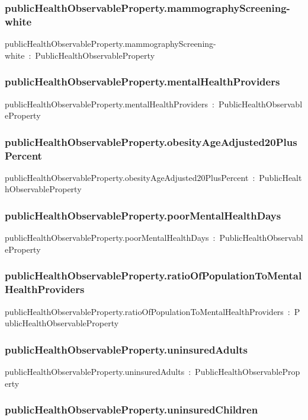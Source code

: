 \documentclass{article}
\begin{document}
\subsubsection*{publicHealthObservableProperty.mammographyScreening-white}

publicHealthObservableProperty.mammographyScreening-white~:~PublicHealthObservableProperty

\subsubsection*{publicHealthObservableProperty.mentalHealthProviders}

publicHealthObservableProperty.mentalHealthProviders~:~PublicHealthObservableProperty

\subsubsection*{publicHealthObservableProperty.obesityAgeAdjusted20PlusPercent}

publicHealthObservableProperty.obesityAgeAdjusted20PlusPercent~:~PublicHealthObservableProperty

\subsubsection*{publicHealthObservableProperty.poorMentalHealthDays}

publicHealthObservableProperty.poorMentalHealthDays~:~PublicHealthObservableProperty

\subsubsection*{publicHealthObservableProperty.ratioOfPopulationToMentalHealthProviders}

publicHealthObservableProperty.ratioOfPopulationToMentalHealthProviders~:~PublicHealthObservableProperty

\subsubsection*{publicHealthObservableProperty.uninsuredAdults}

publicHealthObservableProperty.uninsuredAdults~:~PublicHealthObservableProperty

\subsubsection*{publicHealthObservableProperty.uninsuredChildren}
\end{document}
